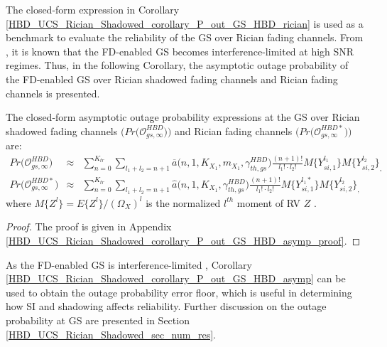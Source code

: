 The closed-form expression in Corollary \ref{HBD_UCS_Rician_Shadowed_corollary_P_out_GS_HBD_rician} \textcolor{black}{is} used as a benchmark to evaluate the reliability of the GS over Rician fading channels. From \cite{ernest2019outage}, it is known that the FD-enabled GS becomes interference-limited at high SNR regimes. Thus, in the following Corollary, the asymptotic outage probability of the FD-enabled GS over Rician shadowed fading channels and Rician fading channels is presented.

\begin{corollary} \label{HBD_UCS_Rician_Shadowed_corollary_P_out_GS_HBD_asymp}
The closed-form asymptotic outage probability expressions at the GS over Rician shadowed fading channels $\big(Pr\big(\mathcal{O}_{gs,\infty}^{HBD}\big)\big)$ and Rician fading channels $\big(Pr\big(\mathcal{O}_{gs,\infty}^{HBD*}\big)\big)$ are:
\begin{eqnarray} 
Pr\big(\mathcal{O}_{gs,\infty}^{HBD}\big) & \approx & \sum_{n=0}^{K_{tr}} \sum_{l_1 + l_2 = n+1} \overline{a}\big(n,1,K_{X_1},m_{X_1},\gamma_{th,gs}^{HBD}\big) \frac{(n+1)!}{l_1! \cdot l_2!} M\{Y_{si,1}^{l_1}\} M\{Y_{si,2}^{l_2}\}_, \label{HBD_UCS_Rician_Shadowed_P_out_GS_HBD_asymp} \\
Pr\big(\mathcal{O}_{gs,\infty}^{HBD*}\big) & \approx & \sum_{n=0}^{K_{tr}} \sum_{l_1 + l_2 = n+1} \widehat{a}\big(n,1,K_{X_1},\gamma_{th,gs}^{HBD}\big) \frac{(n+1)!}{l_1! \cdot l_2!} M\{Y_{si,1}^{l_1*}\} M\{Y_{si,2}^{l_2}\}_, \label{HBD_UCS_Rician_Shadowed_P_out_GS_HBD_rician_asymp}
\end{eqnarray}
where $M\{Z^{l}\}=E\{Z^{l}\}/(\Omega_X)^{l}$ is the normalized $l^{th}$ moment of RV $Z$ \cite{ernest2019outage}.
\end{corollary}
\begin{proof}
The proof is given in Appendix \ref{HBD_UCS_Rician_Shadowed_corollary_P_out_GS_HBD_asymp_proof}.
\end{proof}


As the FD-enabled GS is interference-limited \cite{ernest2019outage}, Corollary \ref{HBD_UCS_Rician_Shadowed_corollary_P_out_GS_HBD_asymp} can be used to obtain the outage probability error floor, which is useful in determining how SI and shadowing affects reliability. Further discussion on the outage probability at GS are presented in Section \ref{HBD_UCS_Rician_Shadowed_sec_num_res}.

